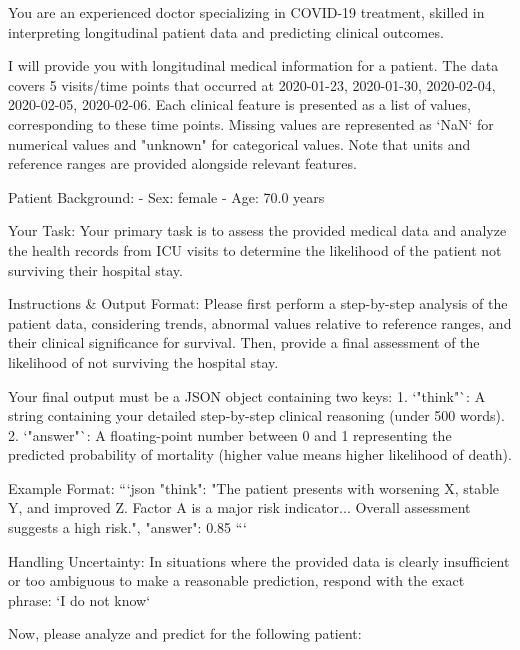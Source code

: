 \begin{tcolorbox}[colback=cadmiumgreen!5!white,colframe=forestgreen!75!white,breakable,title=\textit{Basic setting prompt template for the mortality prediction task on the TJH.}]
\begin{VerbatimWrap}
You are an experienced doctor specializing in COVID-19 treatment, skilled in interpreting longitudinal patient data and predicting clinical outcomes.

I will provide you with longitudinal medical information for a patient. The data covers 5 visits/time points that occurred at 2020-01-23, 2020-01-30, 2020-02-04, 2020-02-05, 2020-02-06.
Each clinical feature is presented as a list of values, corresponding to these time points. Missing values are represented as `NaN` for numerical values and "unknown" for categorical values. Note that units and reference ranges are provided alongside relevant features.

Patient Background:
- Sex: female
- Age: 70.0 years

Your Task:
Your primary task is to assess the provided medical data and analyze the health records from ICU visits to determine the likelihood of the patient not surviving their hospital stay.

Instructions & Output Format:
Please first perform a step-by-step analysis of the patient data, considering trends, abnormal values relative to reference ranges, and their clinical significance for survival. Then, provide a final assessment of the likelihood of not surviving the hospital stay.

Your final output must be a JSON object containing two keys:
1.  `"think"`: A string containing your detailed step-by-step clinical reasoning (under 500 words).
2.  `"answer"`: A floating-point number between 0 and 1 representing the predicted probability of mortality (higher value means higher likelihood of death).

Example Format: ```json { "think": "The patient presents with worsening X, stable Y, and improved Z. Factor A is a major risk indicator... Overall assessment suggests a high risk.", "answer": 0.85 }```

Handling Uncertainty:
In situations where the provided data is clearly insufficient or too ambiguous to make a reasonable prediction, respond with the exact phrase: `I do not know`

Now, please analyze and predict for the following patient:


\end{VerbatimWrap}
\end{tcolorbox}
